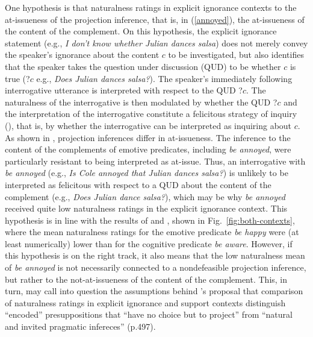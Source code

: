 \documentclass[11pt,fleqn]{article}
\newcommand{\6}{\mbox{$[\hspace*{-.6mm}[$}}
\newcommand{\9}{\mbox{$]\hspace*{-.6mm}]$}}
\newcommand{\citepos}[1]{\citeauthor{#1}'s \citeyear{#1}}
\begin{document}
One hypothesis is that naturalness ratings in explicit ignorance contexts to the at-issueness of the projection inference, that is, in (\ref{annoyed}), the at-issueness of the content of the complement. On this hypothesis, the explicit ignorance statement (e.g., {\em I don't know whether Julian dances salsa}) does not merely convey the speaker's ignorance about the content $c$ to be investigated, but also identifies that the speaker takes the question under discussion (QUD) to be whether $c$ is true (?$c$ e.g., {\em Does Julian dances salsa?}). The speaker's immediately following interrogative utterance is interpreted with respect to the QUD ?$c$. The naturalness of the interrogative is then modulated by whether the QUD ?$c$  and the interpretation of the interrogative constitute a felicitous strategy of inquiry (\citealt[32f.]{roberts12}), that is,  by whether the interrogative can be interpreted as inquiring about $c$. As shown in \citealt{tbd-variability}, projection inferences differ in at-issueness. The inference to the content of the complements of emotive predicates, including {\em be annoyed}, were particularly resistant to being interpreted as at-issue. Thus, an interrogative with {\em be annoyed} (e.g., {\em Is Cole annoyed that Julian dances salsa?}) is unlikely to be interpreted as felicitous with respect to a QUD about the content of the complement (e.g., {\em Does Julian dance salsa?}), which may be why {\em be annoyed} received quite low naturalness ratings in the explicit ignorance context. This hypothesis is in line with the results of \citealt[Exp.~3]{mandelkern-etal2020} and \citealt[Exp.~1]{kalomoiros-schwarz2024}, shown in Fig.~\ref{fig:both-contexts}, where the mean naturalness ratings for the emotive predicate \emph{be happy} were (at least numerically) lower than for the cognitive predicate \emph{be aware}. However, if this hypothesis is on the right track, it also means that the low naturalness mean of \emph{be annoyed} is not necessarily connected to a nondefeasible projection inference, but rather to the not-at-issueness of the content of the complement. This, in turn, may call into question the assumptions behind \citepos{mandelkern-etal2020} proposal that comparison of naturalness ratings in explicit ignorance and support contexts distinguish ``encoded'' presuppositions that ``have no choice but to project'' from ``natural and invited pragmatic infereces'' (p.497).
\end{document}
